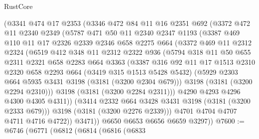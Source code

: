 \begin{lexlean}{RustCore}
\begin{coremodule}
        (@3341
          @474
          @17
          @2353
          (@3346
            @472
            @84
            @11
            @16
            @2351
            @692
            (@3372
              @472
              @11
              @2340
              @2349
              (@5787
                @471
                @50
                @11
                @2340
                @2347
                @1193
                (@3387
                  @469
                  @110
                  @11
                  @17
                  @2326
                  @2339
                  @2346
                  @658
                  @2275
                  @664
                  (@3372
                    @469
                    @11
                    @2312
                    @2324
                    (@6519
                      @412
                      @348
                      @11
                      @2312
                      @2322
                      @936
                      (@5794
                        @318
                        @11
                        @50
                        @655
                        @2311
                        @2321
                        @658
                        @2283
                        @664
                        @3363
                        (@3387
                          @316
                          @92
                          @11
                          @17
                          @1513
                          @2310
                          @2320
                          @658
                          @2293
                          @664
                          (@3419 @315 @1513 @5428 @5432)
                          (@5929 @2303 @664 @5935 @3431 @3198 (@3181 (@3200 @2304 @679)))
                          @3198
                          (@3181 (@3200 @2294 @2310)))
                        @3198
                        (@3181 (@3200 @2284 @2311)))
                      @4290
                      @4293
                      @4296
                      @4300
                      @4305
                      @4311))
                  (@3414 @2332 @664 @3428 @3431 @3198 (@3181 (@3200 @2333 @679)))
                  @3198
                  (@3181 (@3200 @2276 @2339)))
                @4701
                @4704
                @4707
                @4711
                @4716
                @4722))
            @3471))
        @6650
        @6653
        @6656
        @6659
        @3297))
@7600 := @6746
    (@6771
      (@6812
        (@6814
          (@6816
            (@6833

\end{coremodule}
\end{lexlean}
